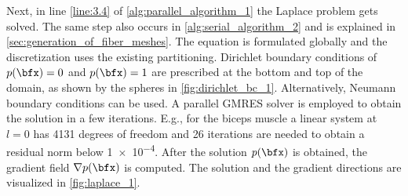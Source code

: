 Next, in line \ref{line:3.4} of \cref{alg:parallel_algorithm_1} the Laplace problem gets solved. The same step also occurs in \cref{alg:serial_algorithm_2} and is explained in \cref{sec:generation_of_fiber_meshes}.
The equation is formulated globally and the discretization uses the existing partitioning. 
Dirichlet boundary conditions of $p(\bfx) = 0$ and $p(\bfx) = 1$ are prescribed at the bottom and top of the domain, as shown by the spheres in \cref{fig:dirichlet_bc_1}. Alternatively, Neumann boundary conditions can be used.
A parallel GMRES solver is employed to obtain the solution in a few iterations. E.g., for the biceps muscle a linear system at $l=0$ has 4131 degrees of freedom and 26 iterations are needed to obtain a residual norm below \num{1e-4}. After the solution $p(\bfx)$ is obtained, the gradient field $\nabla p(\bfx)$ is computed. The solution and the gradient directions are visualized in \cref{fig:laplace_1}.

